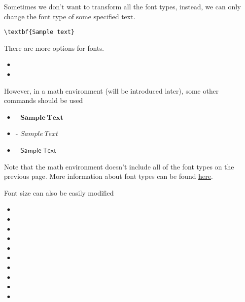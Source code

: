 \begin{frame}[fragile]
	Sometimes we don't want to transform  all the font types, instead, we can only change the font type of some specified text.
	\begin{example}
		\begin{verbatim}
\textbf{Sample text}
		\end{verbatim}
	\end{example}
	There are more options for fonts.
	\begin{itemize}
		\item {}
		\item {}
	\end{itemize}
	However, in a math environment (will be introduced later), some other commands should be used
	\begin{itemize}
		\item {} - $\mathbf{Sample\ Text}$
		\item {} - $\mathit{Sample\ Text}$
		\item {} - $\mathsf{Sample\ Text}$
	\end{itemize}
	Note that the math environment doesn't include all of the font types on the previous page. More information about font types can be found \href{http://www.cnblogs.com/make217/p/6123532.html}{\color{blue}\underline{here}}.
\end{frame}

\begin{frame}
	Font size can also be easily modified
	\begin{itemize}
		\item {}
		\item {}
		\item {}
		\item {}
		\item {}
		\item {}
		\item {}
		\item {}
		\item {}
		\item {}
	\end{itemize}
\end{frame}

